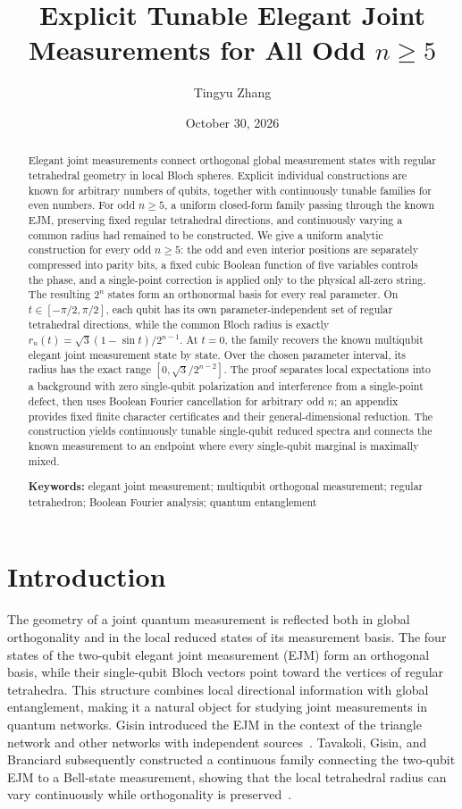 \documentclass[11pt,a4paper]{article}
\title{Explicit Tunable Elegant Joint Measurements for All Odd $n\geq5$}
\author{Tingyu Zhang}
\date{October 30, 2026}
\numberwithin{equation}{section}
\theoremstyle{definition}
\begin{document}
\maketitle
\vspace{-0.5em}
\begin{abstract}
Elegant joint measurements connect orthogonal global measurement states with regular tetrahedral geometry in local Bloch spheres. Explicit individual constructions are known for arbitrary numbers of qubits, together with continuously tunable families for even numbers. For odd $n\geq5$, a uniform closed-form family passing through the known EJM, preserving fixed regular tetrahedral directions, and continuously varying a common radius had remained to be constructed. We give a uniform analytic construction for every odd $n\geq5$: the odd and even interior positions are separately compressed into parity bits, a fixed cubic Boolean function of five variables controls the phase, and a single-point correction is applied only to the physical all-zero string. The resulting $2^n$ states form an orthonormal basis for every real parameter. On $t\in[-\pi/2,\pi/2]$, each qubit has its own parameter-independent set of regular tetrahedral directions, while the common Bloch radius is exactly $r_n(t)=\sqrt3(1-\sin t)/2^{n-1}$. At $t=0$, the family recovers the known multiqubit elegant joint measurement state by state. Over the chosen parameter interval, its radius has the exact range $[0,\sqrt3/2^{n-2}]$. The proof separates local expectations into a background with zero single-qubit polarization and interference from a single-point defect, then uses Boolean Fourier cancellation for arbitrary odd $n$; an appendix provides fixed finite character certificates and their general-dimensional reduction. The construction yields continuously tunable single-qubit reduced spectra and connects the known measurement to an endpoint where every single-qubit marginal is maximally mixed.

\medskip\noindent\textbf{Keywords:} elegant joint measurement; multiqubit orthogonal measurement; regular tetrahedron; Boolean Fourier analysis; quantum entanglement
\end{abstract}

\section{Introduction}

The geometry of a joint quantum measurement is reflected both in global orthogonality and in the local reduced states of its measurement basis. The four states of the two-qubit elegant joint measurement (EJM) form an orthogonal basis, while their single-qubit Bloch vectors point toward the vertices of regular tetrahedra. This structure combines local directional information with global entanglement, making it a natural object for studying joint measurements in quantum networks. Gisin introduced the EJM in the context of the triangle network and other networks with independent sources~\cite{Gisin2017}. Tavakoli, Gisin, and Branciard subsequently constructed a continuous family connecting the two-qubit EJM to a Bell-state measurement, showing that the local tetrahedral radius can vary continuously while orthogonality is preserved~\cite{Tavakoli2021}.
\end{document}
